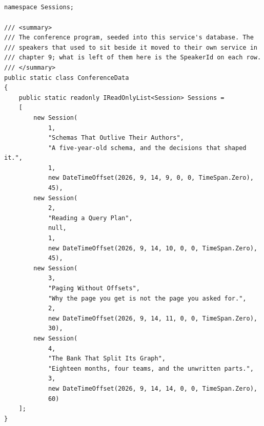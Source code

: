 \subsection*{}
\begin{verbatim}
namespace Sessions;

/// <summary>
/// The conference program, seeded into this service's database. The
/// speakers that used to sit beside it moved to their own service in
/// chapter 9; what is left of them here is the SpeakerId on each row.
/// </summary>
public static class ConferenceData
{
    public static readonly IReadOnlyList<Session> Sessions =
    [
        new Session(
            1,
            "Schemas That Outlive Their Authors",
            "A five-year-old schema, and the decisions that shaped it.",
            1,
            new DateTimeOffset(2026, 9, 14, 9, 0, 0, TimeSpan.Zero),
            45),
        new Session(
            2,
            "Reading a Query Plan",
            null,
            1,
            new DateTimeOffset(2026, 9, 14, 10, 0, 0, TimeSpan.Zero),
            45),
        new Session(
            3,
            "Paging Without Offsets",
            "Why the page you get is not the page you asked for.",
            2,
            new DateTimeOffset(2026, 9, 14, 11, 0, 0, TimeSpan.Zero),
            30),
        new Session(
            4,
            "The Bank That Split Its Graph",
            "Eighteen months, four teams, and the unwritten parts.",
            3,
            new DateTimeOffset(2026, 9, 14, 14, 0, 0, TimeSpan.Zero),
            60)
    ];
}
\end{verbatim}

